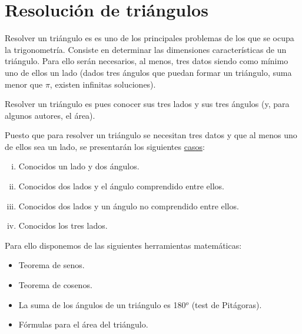 \vspace{5mm}
\section{Resolución de triángulos}
\vspace{1cm}

\begin{definition}

Resolver un triángulo es es uno de los principales problemas de los que se ocupa la trigonometría. Consiste en determinar las dimensiones características de un triángulo. Para ello serán necesarios, al menos, tres datos siendo como mínimo uno de ellos un lado (dados tres ángulos que puedan formar un triángulo, suma menor que $\pi$, existen infinitas soluciones). 

\vspace{2mm} Resolver un triángulo es pues conocer sus tres lados y sus tres ángulos (y, para algunos autores, el área).
	
\end{definition}




\vspace{5mm}Puesto que para resolver un triángulo se necesitan tres datos y que al menos uno de ellos sea un lado, se presentarán los siguientes \underline{casos}:

\begin{enumerate}[i) ]
\vspace{-2mm} \item Conocidos un lado y dos ángulos.
\vspace{-2mm} \item Conocidos dos lados y el ángulo comprendido entre ellos.
\vspace{-2mm} \item Conocidos dos lados y un ángulo no comprendido entre ellos.
\vspace{-2mm} \item Conocidos los tres lados.	
\end{enumerate}

Para ello disponemos de las siguientes herramientas matemáticas:

\begin{itemize}
\vspace{-2mm} \item Teorema de senos.
\vspace{-2mm} \item Teorema de cosenos.
\vspace{-2mm} \item La suma de los ángulos de un triángulo es 180$^o$ \textcolor{gris}{(test de Pitágoras)}.	
\vspace{-2mm} \item Fórmulas para el área del triángulo.
\end{itemize}


